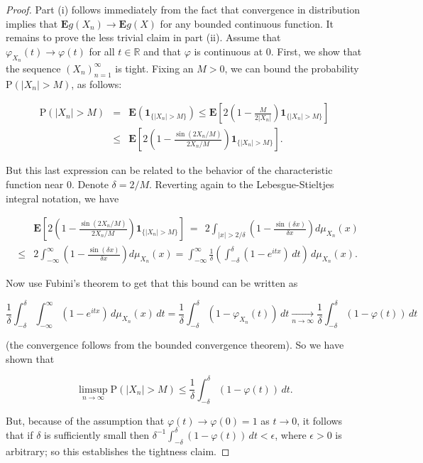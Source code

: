 \documentclass[11pt]{report}
\newcommand{\R}{\mathbb{R}}
\theoremstyle{plain}
\theoremstyle{definition}
\begin{document}
\begin{proof}
Part (i) follows immediately from the fact that
convergence in distribution implies that
$\mathbf{E} g(X_n)\to \mathbf{E} g(X)$ for any
bounded continuous function. It remains to prove the
less trivial claim in part (ii). Assume that
$\varphi_{X_n}(t)\to \varphi(t)$ for all $t\in\R$ and
that $\varphi$ is continuous at $0$. First, we show
that the sequence $(X_n)_{n=1}^\infty$ is tight.
Fixing an $M>0$, we can bound the probability
$\mathrm{P}(|X_n|>M)$, as follows:

\begin{eqnarray*} \mathrm{P}(|X_n|>M) &=& \mathbf{E}\left( \mathbf{1}_{\{|X_n|>M\}}\right) \le
\mathbf{E} \left[ 2 \left( 1-\frac{M}{2|X_n|} \right) \mathbf{1}_{\{|X_n|>M\}}\right] \\
&\le&
\mathbf{E} \left[ 2 \left( 1-\frac{\sin(2X_n/M)}{2X_n/M} \right) \mathbf{1}_{\{|X_n|>M\}}\right].
\end{eqnarray*}

\noindent But this last expression can be related to the
behavior of the characteristic function near $0$.
Denote $\delta=2/M$. Reverting again to the
Lebesgue-Stieltjes integral notation, we have

\begin{eqnarray*}
&&\mathbf{E} \left[ 2 \left( 1-\frac{\sin(2X_n/M)}{2X_n/M} \right) \mathbf{1}_{\{|X_n|>M\}}\right]
 \ =\ \  2\int_{|x|>2/\delta} \left(1-\frac{\sin (\delta x)}{\delta x}\right) d\mu_{X_n}(x) \\
&\le& 2\int_{-\infty}^\infty \left(1-\frac{\sin (\delta x)}{\delta x}\right) d\mu_{X_n}(x)
= \int_{-\infty}^\infty \frac{1}{\delta}\left(\int_{-\delta}^\delta (1-e^{itx})\,dt\right)\,d\mu_{X_n}(x).
\end{eqnarray*}

\noindent Now use Fubini's theorem to get that this bound can
be written as

\[
\frac{1}{\delta} \int_{-\delta}^\delta \int_{-\infty}^\infty (1-e^{itx})\,d\mu_{X_n}(x)\,dt
=\frac{1}{\delta} \int_{-\delta}^\delta (1-\varphi_{X_n}(t))\,dt
\xrightarrow[n\to\infty]{} \frac{1}{\delta} \int_{-\delta}^\delta (1-\varphi(t))\,dt
\]

\noindent (the convergence follows from the bounded convergence
theorem). So we have shown that

\[
\limsup_{n\to\infty} \mathrm{P}(|X_n|>M) \le \frac{1}{\delta} \int_{-\delta}^\delta (1-\varphi(t))\,dt.
\]

\noindent But, because of the assumption that
$\varphi(t)\to \varphi(0)=1$ as $t\to 0$, it follows
that if $\delta$ is sufficiently small then
$\delta^{-1} \int_{-\delta}^\delta (1-\varphi(t))\,dt
< \epsilon$,
where $\epsilon>0$ is arbitrary; so this establishes
the tightness claim.


\end{proof}
\end{document}
